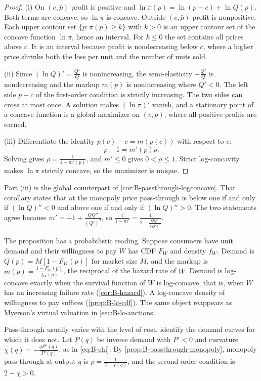 \begin{proof}
(i) On $(c, \bar p)$ profit is positive and $\ln\pi(p) = \ln(p - c) + \ln Q(p)$. Both terms are concave, so
$\ln\pi$ is concave. Outside $(c, \bar p)$ profit is nonpositive. Each upper contour set $\{p : \pi(p) \geq k\}$
with $k > 0$ is an upper contour set of the concave function $\ln\pi$, hence an interval. For $k \leq 0$ the set
contains all prices above $c$. It is an interval because profit is nondecreasing below $c$, where a higher price
shrinks both the loss per unit and the number of units sold.

(ii) Since $(\ln Q)' = \frac{Q'}{Q}$ is nonincreasing, the semi-elasticity $-\frac{Q'}{Q}$ is nondecreasing and
the markup $m(p)$ is nonincreasing where $Q' < 0$. The left side $p - c$ of the first-order condition is strictly
increasing. The two sides can cross at most once. A solution makes $(\ln\pi)'$ vanish, and a stationary point of a
concave function is a global maximizer on $(c, \bar p)$, where all positive profits are earned.

(iii) Differentiate the identity $p(c) - c = m(p(c))$ with respect to $c$:
\[
  \rho - 1 = m'(p)\rho.
\]
Solving gives $\rho = \frac{1}{1 - m'(p)}$, and $m' \leq 0$ gives $0 < \rho \leq 1$. Strict log-concavity makes $\ln\pi$
strictly concave, so the maximizer is unique.
\end{proof}

Part (iii) is the global counterpart of \cref{cor:B-passthrough-logconcave}. That corollary states that at the
monopoly price pass-through is below one if and only if $(\ln Q)'' < 0$ and above one if and only if $(\ln Q)'' > 0$. The
two statements agree because $m' = -1 + \frac{QQ''}{(Q')^2}$, so $\frac{1}{1 - m'} = \frac{1}{2 - \frac{QQ''}{(Q')^2}}$.

The proposition has a probabilistic reading. Suppose consumers have unit demand and their willingness to pay
$W$ has CDF $F_W$ and density $f_W$. Demand is $Q(p) = M[1 - F_W(p)]$ for market size $M$, and the markup is
$m(p) = \frac{1 - F_W(p)}{f_W(p)}$, the reciprocal of the hazard rate of $W$. Demand is log-concave exactly when
the survival function of $W$ is log-concave, that is, when $W$ has an increasing failure rate
(\cref{cor:B-hazard}). A log-concave density of willingness to pay suffices (\cref{prop:B-lc-cdf}). The same
object reappears as Myerson's virtual valuation in \cref{sec:B-lc-auctions}.

Pass-through usually varies with the level of cost. \citet{BulowPfleiderer1983} identify the demand curves for
which it does not. Let $P(q)$ be inverse demand with $P' < 0$ and curvature
$\chi(q) = -\frac{qP''(q)}{P'(q)}$, as in \eqref{eq:B-chi}. By \cref{prop:B-passthrough-monopoly}, monopoly
pass-through at output $q$ is $\rho = \frac{1}{2 - \chi(q)}$, and the second-order condition is $2 - \chi > 0$.

